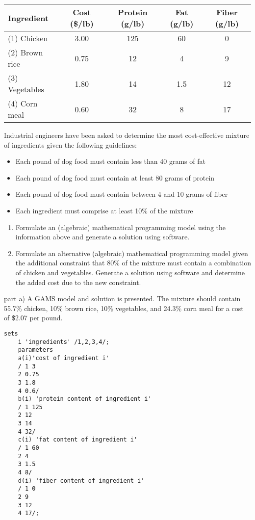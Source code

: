 \begin{enumerate}
\begin{center}
	\begin{tabular}{lcccc} \\
		Ingredient  &   Cost (\$/lb)  & Protein (g/lb)  &  Fat (g/lb) &  Fiber (g/lb)  \\ \hline
		(1) Chicken   &  3.00 & 125 & 60 & 0 \\
		(2) Brown rice   &  0.75 & 12 & 4 & 9 \\
		(3) Vegetables   &  1.80 & 14 & 1.5 & 12 \\
		(4) Corn meal& 0.60 & 32 & 8 & 17
	\end{tabular}
\end{center}

Industrial engineers have been asked to determine the most cost-effective mixture of ingredients given the following guidelines:
\begin{itemize}
	\item Each pound of dog food must contain less than 40 grams of fat
	
	\item Each pound of dog food must contain at least 80 grams of protein 
	
	\item Each pound of dog food must contain between 4 and 10 grams of fiber
	
	\item Each ingredient must comprise at least 10\% of the mixture
\end{itemize}

\begin{enumerate}
	\item Formulate an (algebraic) mathematical programming model using the information above and generate a solution using software.
	
	\item Formulate an alternative (algebraic) mathematical programming model given the additional constraint that 80\% of the mixture must contain a combination of chicken and vegetables. Generate a solution using software and determine the added cost due to the new constraint. 
\end{enumerate}

\begin{solution}
	\bs
	
	part a) A GAMS model and solution is presented. The mixture should contain 55.7\% chicken, 10\% brown rice, 10\% vegetables, and 24.3\% corn meal for a cost of \$2.07 per pound.
	\begin{Verbatim}[samepage=true]
	sets
	i 'ingredients' /1,2,3,4/;
	parameters
	a(i)'cost of ingredient i'
	/ 1 3
	2 0.75
	3 1.8
	4 0.6/
	b(i) 'protein content of ingredient i'
	/ 1 125
	2 12
	3 14
	4 32/
	c(i) 'fat content of ingredient i'
	/ 1 60
	2 4
	3 1.5
	4 8/
	d(i) 'fiber content of ingredient i'
	/ 1 0
	2 9
	3 12
	4 17/;
	

\end{Verbatim}
\end{solution}
\end{enumerate}
